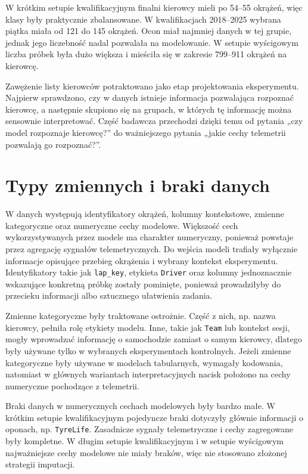 \documentclass[printmode,pl]{mgr}
\begin{document}
W krótkim setupie kwalifikacyjnym finalni kierowcy mieli po 54--55 okrążeń, więc klasy były praktycznie zbalansowane. W kwalifikacjach 2018--2025 wybrana piątka miała od 121 do 145 okrążeń. Ocon miał najmniej danych w tej grupie, jednak jego liczebność nadal pozwalała na modelowanie. W setupie wyścigowym liczba próbek była dużo większa i mieściła się w zakresie 799--911 okrążeń na kierowcę.

Zawężenie listy kierowców potraktowano jako etap projektowania eksperymentu. Najpierw sprawdzono, czy w danych istnieje informacja pozwalająca rozpoznać kierowcę, a następnie skupiono się na grupach, w których tę informację można sensownie interpretować. Część badawcza przechodzi dzięki temu od pytania „czy model rozpoznaje kierowcę?” do ważniejszego pytania „jakie cechy telemetrii pozwalają go rozpoznać?”.

\section{Typy zmiennych i braki danych}

W danych występują identyfikatory okrążeń, kolumny kontekstowe, zmienne kategoryczne oraz numeryczne cechy modelowe. Większość cech wykorzystywanych przez modele ma charakter numeryczny, ponieważ powstaje przez agregację sygnałów telemetrycznych. Do wejścia modeli trafiały wyłącznie informacje opisujące przebieg okrążenia i wybrany kontekst eksperymentu. Identyfikatory takie jak \texttt{lap\_key}, etykieta \texttt{Driver} oraz kolumny jednoznacznie wskazujące konkretną próbkę zostały pominięte, ponieważ prowadziłyby do przecieku informacji albo sztucznego ułatwienia zadania.

Zmienne kategoryczne były traktowane ostrożnie. Część z nich, np. nazwa kierowcy, pełniła rolę etykiety modelu. Inne, takie jak \texttt{Team} lub kontekst sesji, mogły wprowadzać informację o samochodzie zamiast o samym kierowcy, dlatego były używane tylko w wybranych eksperymentach kontrolnych. Jeżeli zmienne kategoryczne były używane w modelach tabularnych, wymagały kodowania, natomiast w głównych wariantach interpretacyjnych nacisk położono na cechy numeryczne pochodzące z telemetrii.

Braki danych w numerycznych cechach modelowych były bardzo małe. W krótkim setupie kwalifikacyjnym pojedyncze braki dotyczyły głównie informacji o oponach, np. \texttt{TyreLife}. Zasadnicze sygnały telemetryczne i cechy zagregowane były kompletne. W długim setupie kwalifikacyjnym i w setupie wyścigowym najważniejsze cechy modelowe nie miały braków, więc nie stosowano złożonej strategii imputacji.
\end{document}
